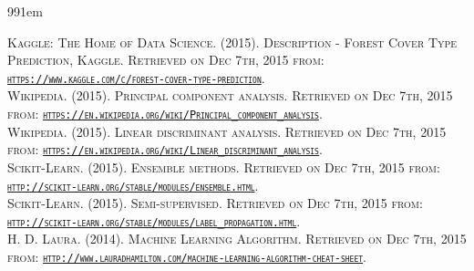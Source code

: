 \documentclass[11pt]{article}
\begin{document}
\def\bibindent{1em}
\begin{thebibliography}{99\kern\bibindent}
\makeatletter
\let\old@biblabel\@biblabel
\def\@biblabel#1{\old@biblabel{#1}\kern\bibindent}
\let\old@bibitem\bibitem
\def\bibitem#1{\old@bibitem{#1}\leavevmode\kern-\bibindent}
\makeatother


\textsc{Kaggle: The Home of Data Science. (2015). Description - Forest Cover Type Prediction, Kaggle. Retrieved on Dec 7th, 2015 from: \href{https://www.kaggle.com/c/forest-cover-type-prediction}{\texttt{https://www.kaggle.com/c/forest-cover-type-prediction}}.}\\
[0.2cm]

\textsc{Wikipedia. (2015). Principal component analysis. Retrieved on Dec 7th, 2015 from: \href{https://en.wikipedia.org/wiki/Principal_component_analysis}{\texttt{https://en.wikipedia.org/wiki/Principal\_component\_analysis}}.}\\
[0.2cm]

\textsc{Wikipedia. (2015). Linear discriminant analysis. Retrieved on Dec 7th, 2015 from: \href{https://en.wikipedia.org/wiki/Linear_discriminant_analysis}{\texttt{https://en.wikipedia.org/wiki/Linear\_discriminant\_analysis}}.}\\
[0.2cm]

\textsc{Scikit-Learn. (2015). Ensemble methods. Retrieved on Dec 7th, 2015 from: \href{http://scikit-learn.org/stable/modules/ensemble.html}{\texttt{http://scikit-learn.org/stable/modules/ensemble.html}}.}\\
[0.2cm]

\textsc{Scikit-Learn. (2015). Semi-supervised. Retrieved on Dec 7th, 2015 from: \href{http://scikit-learn.org/stable/modules/label_propagation.html}{\texttt{http://scikit-learn.org/stable/modules/label\_propagation.html}}.}\\
[0.2cm]

\textsc{H. D. Laura. (2014). Machine Learning Algorithm. Retrieved on Dec 7th, 2015 from: \href{http://www.lauradhamilton.com/machine-learning-algorithm-cheat-sheet}{\texttt{http://www.lauradhamilton.com/machine-learning-algorithm-cheat-sheet}}.}\\
[0.2cm]


\end{thebibliography}
\end{document}

